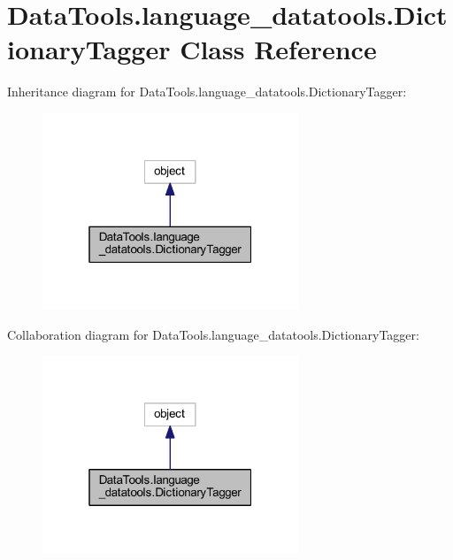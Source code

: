 \hypertarget{class_data_tools_1_1language__datatools_1_1_dictionary_tagger}{}\section{Data\+Tools.\+language\+\_\+datatools.\+Dictionary\+Tagger Class Reference}
\label{class_data_tools_1_1language__datatools_1_1_dictionary_tagger}


Inheritance diagram for Data\+Tools.\+language\+\_\+datatools.\+Dictionary\+Tagger\+:
\nopagebreak
\begin{figure}[H]
\begin{center}
\leavevmode
\includegraphics[width=217pt]{class_data_tools_1_1language__datatools_1_1_dictionary_tagger__inherit__graph}
\end{center}
\end{figure}


Collaboration diagram for Data\+Tools.\+language\+\_\+datatools.\+Dictionary\+Tagger\+:
\nopagebreak
\begin{figure}[H]
\begin{center}
\leavevmode
\includegraphics[width=217pt]{class_data_tools_1_1language__datatools_1_1_dictionary_tagger__coll__graph}
\end{center}
\end{figure}
